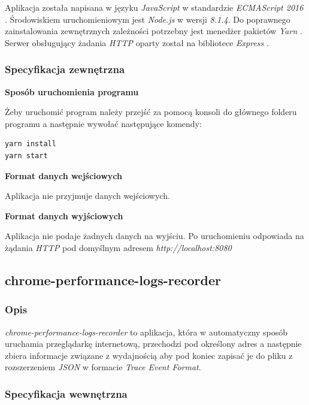\documentclass[polish, twoside, 12pt]{mwart}
\begin{document}
Aplikacja została napisana w języku \emph{JavaScript} w standardzie \emph{ECMAScript 2016} \cite{es2016}. Środowiskiem uruchomieniowym jest \emph{Node.js} \cite{node.js} w wersji \emph{8.1.4}. Do poprawnego zainstalowania zewnętrznych zależności potrzebny jest menedżer pakietów \emph{Yarn} \cite{yarn}. Serwer obsługujący żadania \emph{HTTP} oparty został na bibliotece \emph{Express} \cite{express}.

\subsubsection{Specyfikacja zewnętrzna}

\textbf{Sposób uruchomienia programu} \newline

Żeby uruchomić program należy przejść za pomocą konsoli do głównego folderu programu a następnie wywołać następujące komendy:

\begin{lstlisting}
yarn install
yarn start
\end{lstlisting}

\textbf{Format danych wejściowych} \newline

Aplikacja nie przyjmuje danych wejściowych. \newline

\textbf{Format danych wyjściowych} \newline

Aplikacja nie podaje żadnych danych na wyjściu. Po uruchomieniu odpowiada na żądania \emph{HTTP} pod domyślnym adresem \emph{http://localhost:8080}

\subsection{chrome-performance-logs-recorder}

\subsubsection{Opis}

\emph{chrome-performance-logs-recorder} to aplikacja, która w automatyczny sposób uruchamia przeglądarkę internetową, przechodzi pod określony adres a następnie zbiera informacje związane z wydajnością aby pod koniec zapisać je do pliku z rozszerzeniem \emph{JSON} w formacie \emph{Trace Event Format}.

\subsubsection{Specyfikacja wewnętrzna}
\end{document}
